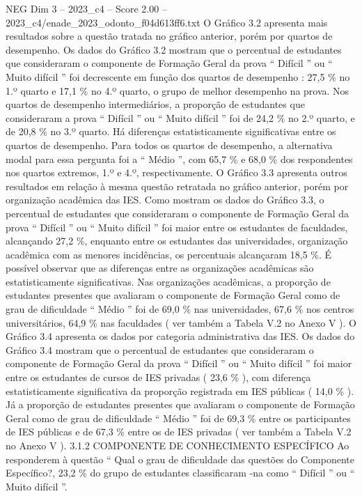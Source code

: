 \begin{textsample}{NEG Dim 3 – 2023\_c4 – Score 2.00 – 2023\_c4/enade\_2023\_odonto\_f04d613ff6.txt}
O Gráfico 3.2 apresenta mais resultados sobre a questão tratada no gráfico anterior, porém por quartos de desempenho.
Os dados do Gráfico 3.2 mostram que o percentual de estudantes que consideraram o componente de Formação Geral da prova “ Difícil ” ou “ Muito difícil ” foi decrescente em função dos quartos de desempenho : 27,5 \% no 1.º quarto e 17,1 \% no 4.º quarto, o grupo de melhor desempenho na prova.
Nos quartos de desempenho intermediários, a proporção de estudantes que consideraram a prova “ Difícil ” ou “ Muito difícil ” foi de 24,2 \% no 2.º quarto, e de 20,8 \% no 3.º quarto.
Há diferenças estatisticamente significativas entre os quartos de desempenho.
Para todos os quartos de desempenho, a alternativa modal para essa pergunta foi a “ Médio ”, com 65,7 \% e 68,0 \% dos respondentes nos quartos extremos, 1.º e 4.º, respectivamente.
O Gráfico 3.3 apresenta outros resultados em relação à mesma questão retratada no gráfico anterior, porém por organização acadêmica das IES.
Como mostram os dados do Gráfico 3.3, o percentual de estudantes que consideraram o componente de Formação Geral da prova “ Difícil ” ou “ Muito difícil ” foi maior entre os estudantes de faculdades, alcançando 27,2 \%, enquanto entre os estudantes das universidades, organização acadêmica com as menores incidências, os percentuais alcançaram 18,5 \%.
É possível observar que as diferenças entre as organizações acadêmicas são estatisticamente significativas.
Nas organizações acadêmicas, a proporção de estudantes presentes que avaliaram o componente de Formação Geral como de grau de dificuldade “ Médio ” foi de 69,0 \% nas universidades, 67,6 \% nos centros universitários, 64,9 \% nas faculdades ( ver também a Tabela V.2 no Anexo V ).
O Gráfico 3.4 apresenta os dados por categoria administrativa das IES.
Os dados do Gráfico 3.4 mostram que o percentual de estudantes que consideraram o componente de Formação Geral da prova “ Difícil ” ou “ Muito difícil ” foi maior entre os estudantes de cursos de IES privadas ( 23,6 \% ), com diferença estatisticamente significativa da proporção registrada em IES públicas ( 14,0 \% ).
Já a proporção de estudantes presentes que avaliaram o componente de Formação Geral como de grau de dificuldade “ Médio ” foi de 69,3 \% entre os participantes de IES públicas e de 67,3 \% entre os de IES privadas ( ver também a Tabela V.2 no Anexo V ). 3.1.2 COMPONENTE DE CONHECIMENTO ESPECÍFICO Ao responderem à questão “ Qual o grau de dificuldade das questões do Componente Específico?, 23,2 \% do grupo de estudantes classificaram -na como “ Difícil ” ou “ Muito difícil ”.

\end{textsample}
